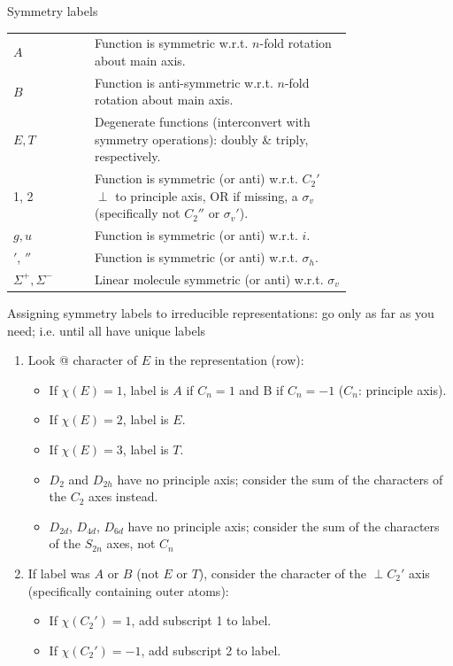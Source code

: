 \documentclass[10pt,landscape]{article}
\newcommand{\tableindent}{\hspace{1.5em}}
\begin{document}
\begin{multicols}{3}
\columnbreak
Symmetry labels
%
\renewcommand{\arraystretch}{1.4}
\begin{tabular}{@{\tableindent}lp{0.76\linewidth}@{}}
	$A$ & Function is symmetric w.r.t. $n$-fold rotation about main axis. \\
	$B$ & Function is anti-symmetric w.r.t. $n$-fold rotation about main axis. \\
	$E, T$ & Degenerate functions (interconvert with symmetry operations): doubly \& triply, respectively. \\
	1, 2 & Function is symmetric (or anti) w.r.t. $C_2'$ $\perp$ to principle axis, OR if missing, a $\sigma_v$ (specifically not $C_2''$ or $\sigma_v'$). \\
	$g, u$ & Function is symmetric (or anti) w.r.t. $i$. \\
	$'$, $''$ & Function is symmetric (or anti) w.r.t. $\sigma_h$. \\
	$\Sigma^+, \Sigma^-$ & Linear molecule symmetric (or anti) w.r.t. $\sigma_v$ \\
\end{tabular}
\renewcommand{\arraystretch}{1}
\medskip

Assigning symmetry labels to irreducible representations: go only as far as you need; i.e. until all have unique labels
\begin{enumerate}
	\item Look @ character of $E$ in the representation (row):
	\begin{itemize}
		\item If $\chi(E)=1$, label is $A$ if $C_n = 1$ and B if $C_n=-1$ ($C_n$: principle axis).
		\item If $\chi(E)=2$, label is $E$. 
		\item If $\chi(E)=3$, label is $T$. 
		\item $D_2$ and $D_{2h}$ have no principle axis; consider the sum of the characters of the $C_2$ axes instead.
		\item $D_{2d}$, $D_{4d}$, $D_{6d}$ have no principle axis; consider the sum of the characters of the $S_{2n}$ axes, not $C_n$
	\end{itemize}

	\item If label was $A$ or $B$ (not $E$ or $T$), consider the character of the $\perp C_2'$ axis (specifically containing outer atoms): 
	\begin{itemize}
		\item If $\chi(C_2')=1$, add subscript 1 to label.
		\item If $\chi(C_2')=-1$, add subscript 2 to label.
	\end{itemize}


\end{enumerate}
\end{multicols}
\end{document}
